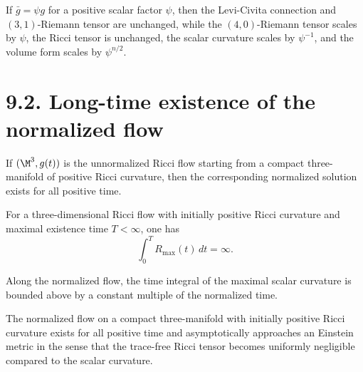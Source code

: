 \begin{lemma}
\label{ch06-lem-scaling-relations}
If \(\bar g=\psi g\) for a positive scalar factor \(\psi\), then the Levi-Civita connection and \((3,1)\)-Riemann tensor are unchanged, while the \((4,0)\)-Riemann tensor scales by \(\psi\), the Ricci tensor is unchanged, the scalar curvature scales by \(\psi^{-1}\), and the volume form scales by \(\psi^{n/2}\).
\end{lemma}

\section*{9.2. Long-time existence of the normalized flow}

\begin{theorem}
\label{ch06-thm-long-time-existence-normalized-flow}
If \((\M^3,g(t))\) is the unnormalized Ricci flow starting from a compact three-manifold of positive Ricci curvature, then the corresponding normalized solution exists for all positive time.
\end{theorem}

\begin{lemma}
\label{ch06-lem-blowup-max-scalar-integral}
For a three-dimensional Ricci flow with initially positive Ricci curvature and maximal existence time \(T<\infty\), one has
\[
\int_0^T R_{\max}(t)\,dt=\infty.
\]
\end{lemma}

\begin{lemma}
\label{ch06-lem-uniform-upper-bound-normalized-max-scalar}
Along the normalized flow, the time integral of the maximal scalar curvature is bounded above by a constant multiple of the normalized time.
\end{lemma}

\begin{corollary}
\label{ch06-cor-asymptotic-einstein}
The normalized flow on a compact three-manifold with initially positive Ricci curvature exists for all positive time and asymptotically approaches an Einstein metric in the sense that the trace-free Ricci tensor becomes uniformly negligible compared to the scalar curvature.
\end{corollary}

